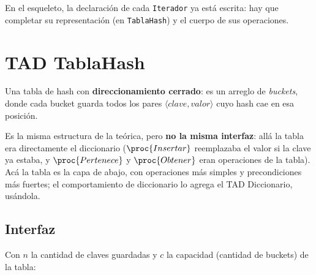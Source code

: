\documentclass{article}
\begin{document}
En el esqueleto, la declaración de cada \texttt{Iterador} ya está
escrita: hay que completar su representación (en \texttt{TablaHash}) y
el cuerpo de sus operaciones.

\section{TAD TablaHash}

Una tabla de hash con \textbf{direccionamiento cerrado}: es un arreglo de
\emph{buckets}, donde cada bucket guarda todos los pares
$\langle clave, valor \rangle$ cuyo hash cae en esa posición.

Es la misma estructura de la teórica, pero \textbf{no la misma
interfaz}: allá la tabla era directamente el diccionario
($\proc{Insertar}$ reemplazaba el valor si la clave ya estaba, y
$\proc{Pertenece}$ y $\proc{Obtener}$ eran operaciones de la tabla). Acá la
tabla es la capa de abajo, con operaciones más simples y precondiciones
más fuertes; el comportamiento de diccionario lo agrega el TAD
Diccionario, usándola.


\subsection{Interfaz}

Con $n$ la cantidad de claves guardadas y $c$ la capacidad (cantidad de
buckets) de la tabla:
\end{document}
